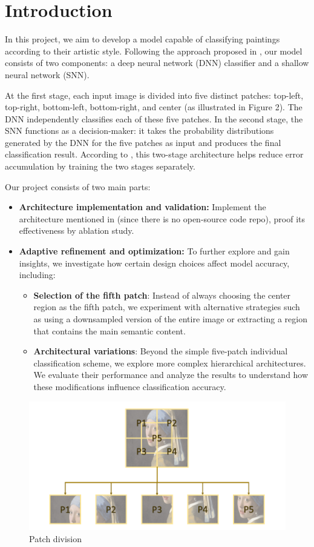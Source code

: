 \section{Introduction}
\label{sec:intro}
In this project, we aim to develop a model capable of classifying paintings according to their artistic style. Following the approach proposed in \cite{imran2023artistic}, our model consists of two components: a deep neural network (DNN) classifier and a shallow neural network (SNN).

At the first stage, each input image is divided into five distinct patches: top-left, top-right, bottom-left, bottom-right, and center (as illustrated in Figure 2). The DNN independently classifies each of these five patches. In the second stage, the SNN functions as a decision-maker: it takes the probability distributions generated by the DNN for the five patches as input and produces the final classification result. According to \cite{imran2023artistic}, this two-stage architecture helps reduce error accumulation by training the two stages separately.

Our project consists of two main parts:
\begin{itemize}
  \item \textbf{Architecture implementation and validation:} Implement the architecture mentioned in \cite{imran2023artistic} (since there is no open-source code repo), proof its effectiveness by ablation study.
  \item \textbf{Adaptive refinement and optimization:} To further explore and gain insights, we investigate how certain design choices affect model accuracy, including:
  \begin{itemize}
    \item \textbf{Selection of the fifth patch}: Instead of always choosing the center region as the fifth patch, we experiment with alternative strategies such as using a downsampled version of the entire image or extracting a region that contains the main semantic content.
    \item \textbf{Architectural variations}: Beyond the simple five-patch individual classification scheme, we explore more complex hierarchical architectures. We evaluate their performance and analyze the results to understand how these modifications influence classification accuracy. 
  \end{itemize}
\end{itemize}
\begin{figure}[h]
  
    \centering
    \includegraphics[scale=1,keepaspectratio,width=.5\textwidth]{patch.png}
    \caption{Patch division}
    \label{fig:main_pipeline}
\end{figure}